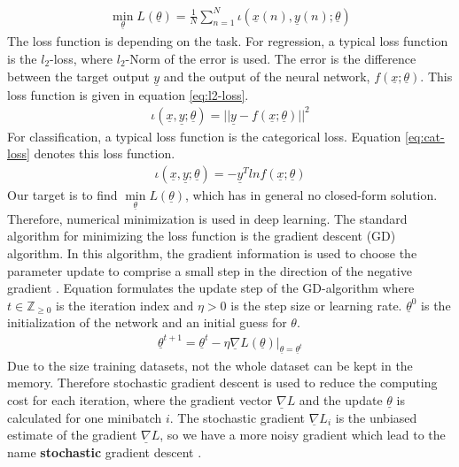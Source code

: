 \documentclass[12pt,DIV14,BCOR12mm,a4paper,footexclude,headinclude,halfparskip-,twoside,openright,cleardoubleempty,idxtotoc,bibtotoc,listtotoc]{scrreprt} %
\numberwithin{equation}{chapter}
\begin{document}
\begin{align}
	\underset{\underline{\theta}}\min L(\underline{\theta}) = \frac{1}{N}\sum_{n=1}^{N}\iota(\underline{x}(n),\underline{y}(n);\underline{\theta})  \label{eq:CostFunction}
\end{align}
The loss function is depending on the task. For regression, a typical loss function is the $l_{2}$-loss, where $l_{2}$-Norm of the error is used. The error is the difference between the target output $\underline{y}$ and the output of the neural network, $f(\underline{x};\underline{\theta})$. This loss function is given in equation \ref{eq:l2-loss}.
\begin{align}
	\iota(\underline{x},\underline{y};\underline{\theta}) = ||\underline{y}-f(\underline{x};\underline{\theta})||^{2}\label{eq:l2-loss}
\end{align}
For classification, a typical loss function is the categorical loss. Equation \ref{eq:cat-loss} denotes this loss function.
\begin{align}
	\iota(\underline{x},\underline{y};\underline{\theta}) = -\underline{y}^{T}ln f(\underline{x};\underline{\theta})\label{eq:cat-loss}
\end{align}
Our target is to find $\underset{\underline{\theta}}\min L(\underline{\theta})$, which has in general no closed-form solution. Therefore, numerical minimization is used in deep learning. The standard algorithm for minimizing the loss function is the gradient descent (GD) algorithm. In this algorithm, the gradient information is used to choose the parameter update to comprise a small step in the direction of the negative gradient \cite{Bishop}. Equation formulates the update step of the GD-algorithm where $t \in \mathbb{Z}_{\geq0}$ is the iteration index and $\eta > 0$ is the step size or learning rate. $\underline{\theta}^{0}$ is the initialization of the network and an initial guess for $\theta$.
\begin{align}
	\underline{\theta}^{t+1} = \underline{\theta}^{t} - \eta\underline{\nabla}L(\underline{\theta})|_{\underline{\theta}=\underline{\theta}^{t}}\label{eq:GradientDescent_update}
\end{align}
Due to the size training datasets, not the whole dataset can be kept in the memory. Therefore stochastic gradient descent is used to reduce the computing cost for each iteration, where the gradient vector $\underline{\nabla}L$ and the update $\underline{\theta}$ is calculated for one minibatch $i$. The stochastic gradient $\underline{\nabla}L_{i}$ is the unbiased estimate of the gradient $\underline{\nabla}L$, so we have a more noisy gradient which lead to the name \textbf{stochastic} gradient descent \cite{DeepLearningDive}.\\
\end{document}
